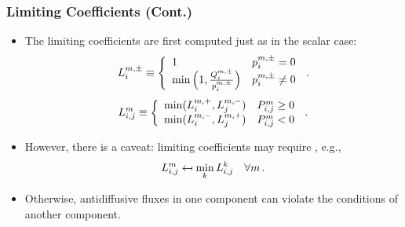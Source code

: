 \documentclass{beamer} \useoutertheme{infolines}
\begin{document}
\begin{frame}
\frametitle{Limiting Coefficients (Cont.)}

\begin{itemize}
  \item The limiting coefficients are first computed just as in the scalar case:
    \begin{equation}
      L_i^{m,\pm} \equiv\left\{
        \begin{array}{l l}
          1 & p_i^{m,\pm} = 0\\
          \min\left(1,\frac{Q_i^{m,\pm}}
            {p_i^{m,\pm}}\right) &
          p_i^{m,\pm} \ne 0
        \end{array}
      \right. \,.
    \end{equation}
    \begin{equation}
      \limiterletter\ij^\componentindex \equiv\left\{
        \begin{array}{l l}
          \min(L_i^{\componentindex,+},L_j^{\componentindex,-}) &
            \correctionfluxij^\componentindex \geq 0\\
          \min(L_i^{\componentindex,-},L_j^{\componentindex,+}) &
            \correctionfluxij^\componentindex < 0
        \end{array}
      \right. \eqp
    \end{equation}
  \item However, there is a caveat: limiting coefficients may require
    , e.g.,
    \begin{equation}
      L_{i,j}^m \mapsfrom
        \min\limits_kL_{i,j}^k \quad \forall m \,.
    \end{equation}
  \item Otherwise, antidiffusive fluxes in one component can violate the
    conditions of another component.
\end{itemize}

\end{frame}
\end{document}
